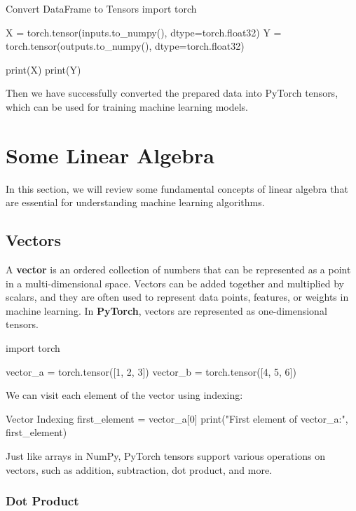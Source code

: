 \begin{pythoncode}{Convert DataFrame to Tensors}
import torch

X = torch.tensor(inputs.to_numpy(), dtype=torch.float32)
Y = torch.tensor(outputs.to_numpy(), dtype=torch.float32)

print(X)
print(Y)
\end{pythoncode}

Then we have successfully converted the prepared data into PyTorch tensors, which can be used for training machine learning models.

\section{Some Linear Algebra}

In this section, we will review some fundamental concepts of linear algebra that are essential for understanding machine learning algorithms.

\subsection{Vectors}

A \textbf{vector} is an ordered collection of numbers that can be represented as a point in a multi-dimensional space. Vectors can be added together and multiplied by scalars, and they are often used to represent data points, features, or weights in machine learning. In \textbf{PyTorch}, vectors are represented as one-dimensional tensors.

\begin{pythoncode}
import torch

vector_a = torch.tensor([1, 2, 3])
vector_b = torch.tensor([4, 5, 6])
\end{pythoncode}

We can visit each element of the vector using indexing:

\begin{pythoncode}{Vector Indexing}
first_element = vector_a[0]
print("First element of vector_a:", first_element)
\end{pythoncode}

Just like arrays in NumPy, PyTorch tensors support various operations on vectors, such as addition, subtraction, dot product, and more.

\subsubsection{Dot Product}

